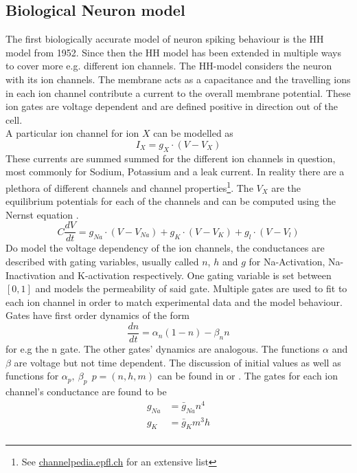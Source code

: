 \subsection{Biological Neuron model}
The first biologically accurate model of neuron spiking behaviour is the \ac{HH} model from 1952\cite{hodgkin_currents_1952}. Since then the \ac{HH} model has been extended in multiple ways to cover more e.g. different ion channels. The \ac{HH}-model considers the neuron with its ion channels. The membrane acts as a capacitance and the travelling ions in each ion channel contribute a current to the overall membrane potential. These ion gates are voltage dependent and are defined positive in direction out of the cell.\\
A particular ion channel for ion $X$ can be modelled as
\begin{equation}
I_X= g_X \cdot (V-V_X)
\end{equation}
These currents are summed summed for the different ion channels in question, most commonly for Sodium, Potassium and a leak current. In reality there are a plethora of different channels and channel properties\footnote{See  \url{channelpedia.epfl.ch} for an extensive list}. The $V_X$ are the equilibrium potentials for each of the channels and can be computed using the Nernst equation \cite{johnston_foundations_1995}.
\begin{equation}
C \frac{dV}{dt} = g_{Na} \cdot (V-V_{Na}) + g_K \cdot (V-V_K) + g_l \cdot (V-V_l)
\end{equation}
Do model the voltage dependency of the ion channels, the conductances are described with gating variables, usually called $n$, $h$ and $g$ for Na-Activation, Na-Inactivation and K-activation respectively. One gating variable is set between $[0,1]$ and models the permeability of said gate. Multiple gates are used to fit to each ion channel in order to match experimental data and the model behaviour.\\
Gates have first order dynamics of the form
\begin{equation}
\frac{dn}{dt} = \alpha_n(1-n) - \beta_n n
\end{equation}
for e.g the n gate. The other gates' dynamics are analogous. The functions $\alpha$ and $\beta$ are voltage but not time dependent. The discussion of initial values as well as functions for $\alpha_p,\ \beta_p\ \ p = (n,h,m)$ can be found in \cite{hodgkin_quantitative_1952} or \cite{johnston_foundations_1995}. The gates for each ion channel's conductance are found to be
\begin{equation}
\begin{aligned}
g_{Na} &= \bar{g}_{Na} n^4\\
g_{K} &= \bar{g}_{K} m^3h\\
\end{aligned}
\end{equation}
